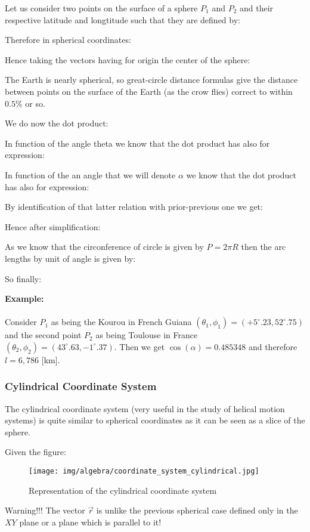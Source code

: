 	Let us consider two points on the surface of a sphere $P_1$ and $P_2$ and their respective latitude and longtitude such that they are defined by:
	
	Therefore in spherical coordinates:
	
	Hence taking the vectors having for origin the center of the sphere:
	
	The Earth is nearly spherical, so great-circle distance formulas give the distance between points on the surface of the Earth (as the crow flies) correct to within $0.5\%$ or so.
	
	We do now the dot product:
	
	In function of the angle theta we know that the dot product has also for expression:
	
	In function of the an angle that we will denote $\alpha$ we know that the dot product has also for expression:
	
	By identification of that latter relation with prior-previous one we get:
	
	Hence after simplification:
	
	As we know that the circonference of circle is given by $P=2\pi R$ then the arc lengths by unit of angle is given by:
	
	So finally:
	
	\begin{tcolorbox}[colframe=black,colback=white,sharp corners]
	\textbf{{\Large {}}Example:}\\\\
	Consider $P_1$ as being the Kourou in French Guiana $(\theta_1,\phi_1)=(+5^\circ.23,52^\circ.75)$ and the second point $P_2$ as being Toulouse in France $(\theta_2,\phi_2)=(43^\circ.63,-1^\circ.37)$. Then we get $\cos(\alpha)=0.485348$ and therefore $l=6,786$ [km].
	\end{tcolorbox}

	\pagebreak
	\subsubsection{Cylindrical Coordinate System}\label{cylindrical coordinates}
	The cylindrical coordinate system (very useful in the study of helical motion systems) is quite similar to spherical coordinates as it can be seen as a slice of the sphere. 

	Given the figure:
	\begin{figure}[H]
		\centering
		\texttt{[image: img/algebra/coordinate\_system\_cylindrical.jpg]}
		\caption{Representation of the cylindrical coordinate system}
	\end{figure}
	Warning!!! The vector $\vec{r}$ is unlike the previous spherical case defined only in the $XY$ plane or a plane which is parallel to it!
	
